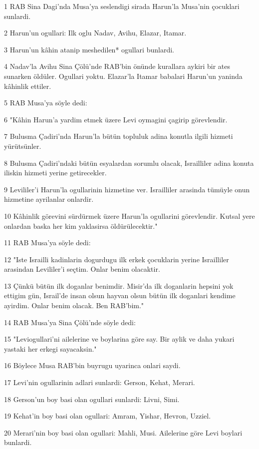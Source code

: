 \par 1 RAB Sina Dagi'nda Musa'ya seslendigi sirada Harun'la Musa'nin çocuklari sunlardi.
\par 2 Harun'un ogullari: Ilk oglu Nadav, Avihu, Elazar, Itamar.
\par 3 Harun'un kâhin atanip meshedilen* ogullari bunlardi.
\par 4 Nadav'la Avihu Sina Çölü'nde RAB'bin önünde kurallara aykiri bir ates sunarken öldüler. Ogullari yoktu. Elazar'la Itamar babalari Harun'un yaninda kâhinlik ettiler.
\par 5 RAB Musa'ya söyle dedi:
\par 6 "Kâhin Harun'a yardim etmek üzere Levi oymagini çagirip görevlendir.
\par 7 Bulusma Çadiri'nda Harun'la bütün topluluk adina konutla ilgili hizmeti yürütsünler.
\par 8 Bulusma Çadiri'ndaki bütün esyalardan sorumlu olacak, Israilliler adina konuta iliskin hizmeti yerine getirecekler.
\par 9 Levililer'i Harun'la ogullarinin hizmetine ver. Israilliler arasinda tümüyle onun hizmetine ayrilanlar onlardir.
\par 10 Kâhinlik görevini sürdürmek üzere Harun'la ogullarini görevlendir. Kutsal yere onlardan baska her kim yaklasirsa öldürülecektir."
\par 11 RAB Musa'ya söyle dedi:
\par 12 "Iste Israilli kadinlarin dogurdugu ilk erkek çocuklarin yerine Israilliler arasindan Levililer'i seçtim. Onlar benim olacaktir.
\par 13 Çünkü bütün ilk doganlar benimdir. Misir'da ilk doganlarin hepsini yok ettigim gün, Israil'de insan olsun hayvan olsun bütün ilk doganlari kendime ayirdim. Onlar benim olacak. Ben RAB'bim."
\par 14 RAB Musa'ya Sina Çölü'nde söyle dedi:
\par 15 "Leviogullari'ni ailelerine ve boylarina göre say. Bir aylik ve daha yukari yastaki her erkegi sayacaksin."
\par 16 Böylece Musa RAB'bin buyrugu uyarinca onlari saydi.
\par 17 Levi'nin ogullarinin adlari sunlardi: Gerson, Kehat, Merari.
\par 18 Gerson'un boy basi olan ogullari sunlardi: Livni, Simi.
\par 19 Kehat'in boy basi olan ogullari: Amram, Yishar, Hevron, Uzziel.
\par 20 Merari'nin boy basi olan ogullari: Mahli, Musi. Ailelerine göre Levi boylari bunlardi.
